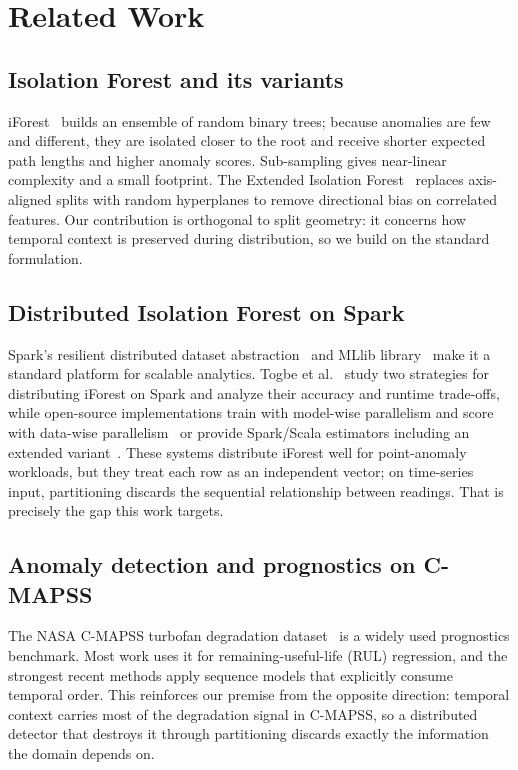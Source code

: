 \documentclass[conference]{IEEEtran}
\begin{document}
\section{Related Work}
\subsection{Isolation Forest and its variants}
iForest~\cite{liu2008isolation,liu2012isolation} builds an ensemble of random binary trees; because anomalies are few and different, they are isolated closer to the root and receive shorter expected path lengths and higher anomaly scores. Sub-sampling gives near-linear complexity and a small footprint. The Extended Isolation Forest~\cite{hariri2021extended} replaces axis-aligned splits with random hyperplanes to remove directional bias on correlated features. Our contribution is orthogonal to split geometry: it concerns how temporal context is preserved during distribution, so we build on the standard formulation.

\subsection{Distributed Isolation Forest on Spark}
Spark's resilient distributed dataset abstraction~\cite{zaharia2012rdd} and MLlib library~\cite{meng2016mllib} make it a standard platform for scalable analytics. Togbe et al.~\cite{togbe2022distributed} study two strategies for distributing iForest on Spark and analyze their accuracy and runtime trade-offs, while open-source implementations train with model-wise parallelism and score with data-wise parallelism~\cite{titicaca} or provide Spark/Scala estimators including an extended variant~\cite{linkedin}. These systems distribute iForest well for point-anomaly workloads, but they treat each row as an independent vector; on time-series input, partitioning discards the sequential relationship between readings. That is precisely the gap this work targets.

\subsection{Anomaly detection and prognostics on C-MAPSS}
The NASA C-MAPSS turbofan degradation dataset~\cite{saxena2008damage} is a widely used prognostics benchmark. Most work uses it for remaining-useful-life (RUL) regression, and the strongest recent methods apply sequence models that explicitly consume temporal order. This reinforces our premise from the opposite direction: temporal context carries most of the degradation signal in C-MAPSS, so a distributed detector that destroys it through partitioning discards exactly the information the domain depends on.
\end{document}
